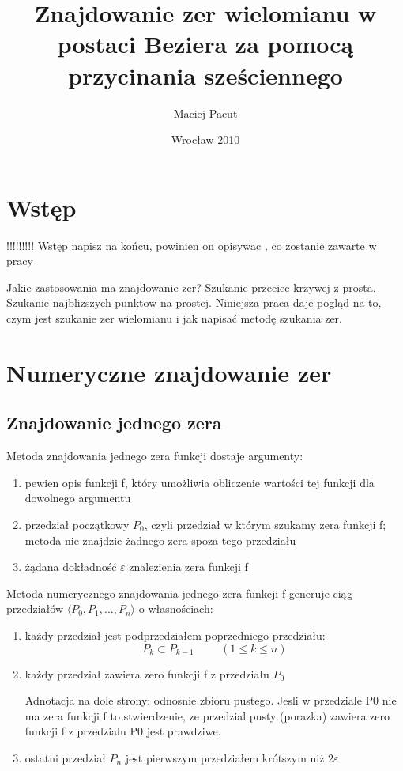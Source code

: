 \documentclass[11pt,a4paper,oneside]{report}
\title{Znajdowanie zer wielomianu w postaci Beziera za pomocą przycinania sześciennego}
\author{Maciej Pacut}
\date{Wrocław 2010}
\begin{document}
\maketitle
\newpage

\section{Wstęp}

!!!!!!!!! Wstęp napisz na końcu, powinien on opisywac , co zostanie zawarte w pracy

Jakie zastosowania ma znajdowanie zer? Szukanie przeciec krzywej z prosta. Szukanie najblizszych punktow na prostej.
Niniejsza praca daje pogląd na to, czym jest szukanie zer wielomianu i jak napisać metodę szukania zer.

\section{Numeryczne znajdowanie zer}

\subsection{Znajdowanie jednego zera}

Metoda znajdowania jednego zera funkcji dostaje argumenty:
\begin{enumerate}
\item pewien opis funkcji f, który umożliwia obliczenie wartości tej funkcji dla dowolnego argumentu
\item przedział początkowy $P_0$, czyli przedział w którym szukamy zera funkcji f; metoda nie znajdzie żadnego zera spoza tego przedziału
\item żądana dokładność $\varepsilon$ znalezienia zera funkcji f
\end{enumerate}

Metoda numerycznego znajdowania jednego zera funkcji f generuje ciąg przedziałów $\langle P_0, P_1, ..., P_n\rangle$ o własnościach:
\begin{enumerate}
\item każdy przedział jest podprzedziałem poprzedniego przedziału:
$$P_k \subset P_{k-1}\hspace{1cm}(1 \leq k \leq n)$$
\item każdy przedział zawiera zero funkcji f z przedziału $P_0$

Adnotacja na dole strony: odnosnie zbioru pustego. Jesli w przedziale P0 nie ma zera funkcji f to stwierdzenie, ze przedzial pusty (porazka) zawiera zero funkcji f z przedzialu P0 jest prawdziwe.

\item ostatni przedział $P_n$ jest pierwszym przedziałem krótszym niż $2 \varepsilon$
\end{enumerate}
\end{document}
